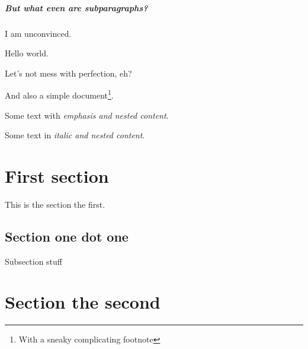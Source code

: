 \documentclass{scrartcl}
\begin{document}
\subparagraph{But what even are subparagraphs?}

I am unconvinced.

Hello world.

Let's not mess with perfection, eh?

And also a simple document\footnote{With a sneaky complicating footnote}.

Some text with \emph{emphasis and \emph{nested} content}.

Some text in \textit{italic and \textit{nested} content}.

\section{First section}

This is the section the first.

\subsection{Section one dot one}

Subsection stuff

\section{Section the second}


    
\end{document}
